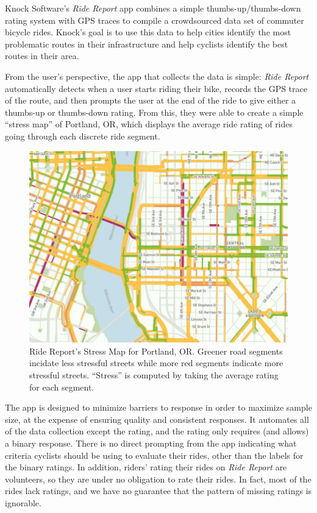 \documentclass[12pt,twoside]{reedthesis}
\begin{document}
  Knock Software's \emph{Ride Report} app combines a simple
  thumbs-up/thumbs-down rating system with GPS traces to compile a
  crowdsourced data set of commuter bicycle rides. Knock's goal is to use
  this data to help cities identify the most problematic routes in their
  infrastructure and help cyclists identify the best routes in their area.
  
  From the user's perspective, the app that collects the data is simple:
  \emph{Ride Report} automatically detects when a user starts riding their
  bike, records the GPS trace of the route, and then prompts the user at
  the end of the ride to give either a thumbs-up or thumbs-down rating.
  From this, they were able to create a simple ``stress map'' of Portland,
  OR, which displays the average ride rating of rides going through each
  discrete ride segment.
  
  \begin{figure}[h!tbp]
  \centering
  \includegraphics[angle = 0,scale = 0.75]{figure/stress_map.jpg}
  \caption[Ride Report's Stress Map for Portland, OR.]{\normalsize{Ride Report's Stress Map for Portland, OR. Greener road segments incidate less
  stressful streets while more red segments indicate more stressful streets. 
  ``Stress'' is computed by taking the average rating for each segment.}}
  \label{fig:stress-map}
  \end{figure}
  
  The app is designed to minimize barriers to response in order to
  maximize sample size, at the expense of ensuring quality and consistent
  responses. It automates all of the data collection except the rating,
  and the rating only requires (and allows) a binary response. There is no
  direct prompting from the app indicating what criteria cyclists should
  be using to evaluate their rides, other than the labels for the binary
  ratings. In addition, riders' rating their rides on \textit{Ride Report}
  are volunteers, so they are under no obligation to rate their rides. In
  fact, most of the rides lack ratings, and we have no guarantee that the
  pattern of missing ratings is ignorable.
  
\end{document}
